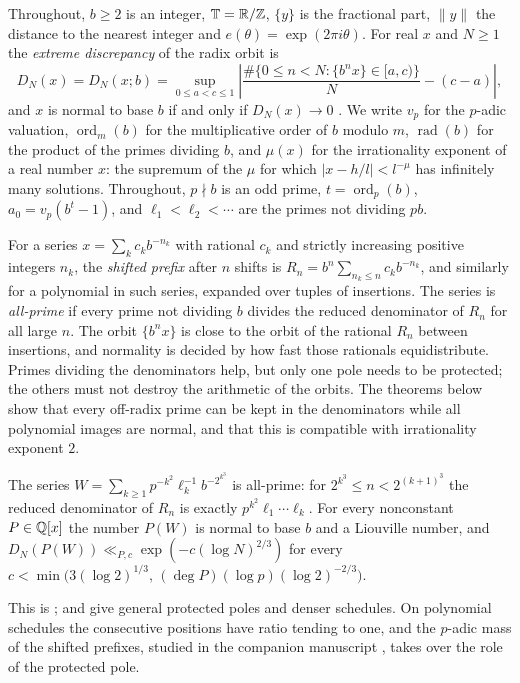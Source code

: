 \documentclass[11pt]{article}
\newcommand{\dist}[1]{\lVert #1\rVert}
\newcommand{\fr}[1]{\{#1\}}
\DeclareMathOperator{\ord}{ord}
\DeclareMathOperator{\rad}{rad}
\begin{document}
Throughout, $b\ge2$ is an integer, $\mathbb T=\mathbb R/\mathbb Z$, $\fr{y}$ is the fractional part, $\dist{y}$ the distance to the
nearest integer and $e(\theta)=\exp(2\pi i\theta)$. For real $x$ and $N\ge1$ the \emph{extreme discrepancy} of
the radix orbit is
\[
D_N(x)=D_N(x;b)=\sup_{0\le a<c\le 1}\left|\frac{\#\{0\le n<N:\fr{b^nx}\in[a,c)\}}{N}-(c-a)\right|,
\]
and $x$ is normal to base $b$ if and only if $D_N(x)\to0$ \cite[Chapter~1, Theorem~8.1]{KN}. We write $v_p$ for
the $p$-adic valuation, $\ord_m(b)$ for the multiplicative order of $b$ modulo $m$, $\rad(b)$ for the product of
the primes dividing $b$, and $\mu(x)$ for the irrationality exponent of a real number $x$: the supremum of the
$\mu$ for which $|x-h/l|<l^{-\mu}$ has infinitely many solutions. Throughout, $p\nmid b$ is an odd prime,
$t=\ord_p(b)$, $a_0=v_p(b^t-1)$, and $\ell_1<\ell_2<\cdots$ are the primes not dividing $pb$.

For a series $x=\sum_kc_kb^{-n_k}$ with rational $c_k$ and strictly increasing positive integers $n_k$, the
\emph{shifted prefix} after $n$ shifts is $R_n=b^n\sum_{n_k\le n}c_kb^{-n_k}$, and similarly for a polynomial in such
series, expanded over tuples of insertions. The series is \emph{all-prime} if every prime not dividing $b$
divides the reduced denominator of $R_n$ for all large $n$. The orbit $\fr{b^nx}$ is close to the orbit of the
rational $R_n$ between insertions, and normality is decided by how fast those rationals equidistribute. Primes
dividing the denominators help, but only one pole needs to be protected; the others must not destroy the
arithmetic of the orbits. The theorems below show that every off-radix prime can be kept in the denominators
while all polynomial images are normal, and that this is compatible with irrationality exponent $2$.

\begin{maintheorem}\label{thm:A}
The series $W=\sum_{k\ge1}p^{-k^2}\ell_k^{-1}b^{-2^{k^3}}$ is all-prime: for $2^{k^3}\le n<2^{(k+1)^3}$ the reduced
denominator of $R_n$ is exactly $p^{k^2}\ell_1\cdots\ell_k$. For every nonconstant $P\in\mathbb Q[x]$ the number $P(W)$ is
normal to base $b$ and a Liouville number, and $D_N(P(W))\ll_{P,c}\exp(-c(\log N)^{2/3})$ for every
$c<\min\bigl(3(\log2)^{1/3},\,(\deg P)(\log p)(\log 2)^{-2/3}\bigr)$.
\end{maintheorem}

This is ;  and  give general protected poles and denser
schedules. On polynomial schedules the consecutive positions have ratio tending to one, and the $p$-adic mass of
the shifted prefixes, studied in the companion manuscript \cite{PaperVIIv2}, takes over the role of the
protected pole.
\end{document}
